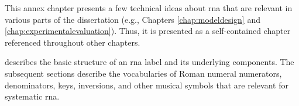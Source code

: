 
This annex chapter presents a few technical ideas about
\gls{rna} that are relevant in various parts of the
dissertation (e.g., Chapters \ref{chap:modeldesign} and
\ref{chap:experimentalevaluation}). Thus, it is presented as
a self-contained chapter referenced throughout other
chapters.

 describes
the basic structure of an \gls{rna} label and its underlying
components. The subsequent sections describe the
vocabularies of Roman numeral numerators, denominators,
keys, inversions, and other musical symbols that are
relevant for systematic \gls{rna}.
